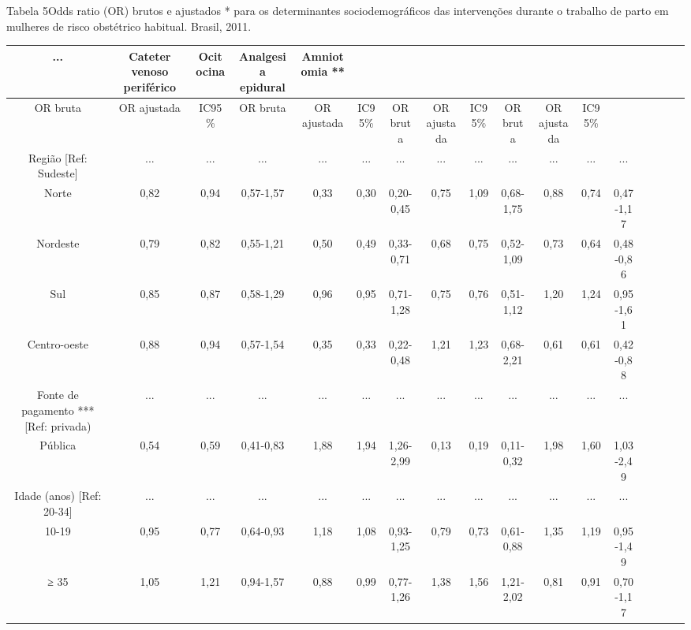 \documentclass{article}
\begin{document}
Tabela 5Odds ratio (OR) brutos e ajustados * para os determinantes
sociodemográficos das intervenções durante o trabalho de parto em
mulheres de risco obstétrico habitual. Brasil, 2011.\begin{table}
\small\centering
\begin{tabulary}{\linewidth}{ C C C C C C C C C C C C C C C C C }
\hline... & Cateter venoso periférico & Ocitocina & Analgesia epidural & Amniotomia
**\\ \hline
OR bruta & OR ajustada & IC95\% & OR bruta & OR ajustada & IC95\% & OR bruta &
OR ajustada & IC95\% & OR bruta & OR ajustada & IC95\%\\ \hline
Região [Ref: Sudeste]
& ...
& ...
& ...
& ...
& ...
& ...
& ...
& ...
& ...
& ...
& ...
& ...
\\ \hline

Norte
& 0,82
& 0,94
& 0,57-1,57
& 0,33
& 0,30
& 0,20-0,45
& 0,75
& 1,09
& 0,68-1,75
& 0,88
& 0,74
& 0,47-1,17
\\ \hline

Nordeste
& 0,79
& 0,82
& 0,55-1,21
& 0,50
& 0,49
& 0,33-0,71
& 0,68
& 0,75
& 0,52-1,09
& 0,73
& 0,64
& 0,48-0,86
\\ \hline

Sul
& 0,85
& 0,87
& 0,58-1,29
& 0,96
& 0,95
& 0,71-1,28
& 0,75
& 0,76
& 0,51-1,12
& 1,20
& 1,24
& 0,95-1,61
\\ \hline

Centro-oeste
& 0,88
& 0,94
& 0,57-1,54
& 0,35
& 0,33
& 0,22-0,48
& 1,21
& 1,23
& 0,68-2,21
& 0,61
& 0,61
& 0,42-0,88
\\ \hline

Fonte de pagamento *** [Ref: privada)
& ...
& ...
& ...
& ...
& ...
& ...
& ...
& ...
& ...
& ...
& ...
& ...
\\ \hline

Pública
& 0,54
& 0,59
& 0,41-0,83
& 1,88
& 1,94
& 1,26-2,99
& 0,13
& 0,19
& 0,11-0,32
& 1,98
& 1,60
& 1,03-2,49
\\ \hline

Idade (anos) [Ref: 20-34]
& ...
& ...
& ...
& ...
& ...
& ...
& ...
& ...
& ...
& ...
& ...
& ...
\\ \hline

10-19
& 0,95
& 0,77
& 0,64-0,93
& 1,18
& 1,08
& 0,93-1,25
& 0,79
& 0,73
& 0,61-0,88
& 1,35
& 1,19
& 0,95-1,49
\\ \hline

≥ 35
& 1,05
& 1,21
& 0,94-1,57
& 0,88
& 0,99
& 0,77-1,26
& 1,38
& 1,56
& 1,21-2,02
& 0,81
& 0,91
& 0,70-1,17
\\ \hline


\end{tabulary}
\end{table}
\end{document}
